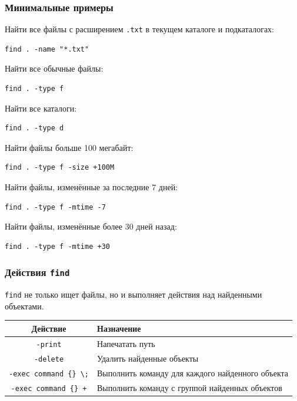 \documentclass[12pt,a4paper]{article}
\begin{document}
\subsubsection{Минимальные примеры}

Найти все файлы с расширением \texttt{.txt} в текущем каталоге и подкаталогах:

\begin{verbatim}
find . -name "*.txt"
\end{verbatim}

Найти все обычные файлы:

\begin{verbatim}
find . -type f
\end{verbatim}

Найти все каталоги:

\begin{verbatim}
find . -type d
\end{verbatim}

Найти файлы больше 100 мегабайт:

\begin{verbatim}
find . -type f -size +100M
\end{verbatim}

Найти файлы, изменённые за последние 7 дней:

\begin{verbatim}
find . -type f -mtime -7
\end{verbatim}

Найти файлы, изменённые более 30 дней назад:

\begin{verbatim}
find . -type f -mtime +30
\end{verbatim}

\subsubsection{Действия \texttt{find}}

\texttt{find} не только ищет файлы, но и выполняет действия над найденными объектами.

\begin{center}
\begin{tabular}{|c|p{10cm}|}
\hline
Действие & Назначение \\
\hline
\texttt{-print} & Напечатать путь \\
\hline
\texttt{-delete} & Удалить найденные объекты \\
\hline
\texttt{-exec command \{\} \textbackslash;} & Выполнить команду для каждого найденного объекта \\
\hline
\texttt{-exec command \{\} +} & Выполнить команду с группой найденных объектов \\
\hline
\end{tabular}
\end{center}
\end{document}
